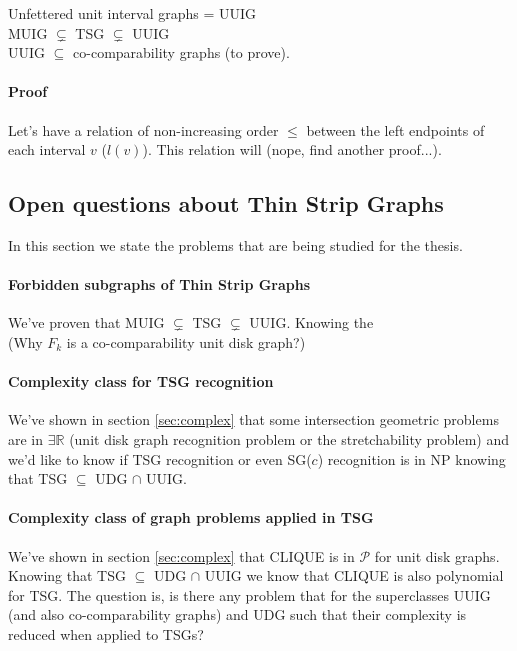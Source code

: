 Unfettered unit interval graphs = UUIG\\

MUIG $\subsetneq$ TSG $\subsetneq$ UUIG\\

UUIG $\subseteq$ co-comparability graphs (to prove).
\paragraph{Proof} Let's have a relation of non-increasing order $\leq$ between the left
endpoints of each interval $v$ ($l(v)$). This relation will (nope, find another proof...).


\subsection{Open questions about Thin Strip Graphs}
In this section we state the problems that are being studied for the thesis.

\paragraph{Forbidden subgraphs of Thin Strip Graphs}
  We've proven that MUIG $\subsetneq$ TSG $\subsetneq$ UUIG. Knowing the\\
  (Why $F_k$ is a co-comparability unit disk graph?)

\paragraph{Complexity class for TSG recognition}
  We've shown in section \ref{sec:complex} that some intersection
  geometric problems are in $\exists \mathbb{R}$ (unit disk graph
  recognition problem or the stretchability problem) and we'd like to
  know if TSG recognition or even SG($c$) recognition is in NP knowing
  that TSG $\subseteq$ UDG $\cap$ UUIG.

\paragraph{Complexity class of graph problems applied in TSG}
  We've shown in section \ref{sec:complex} that CLIQUE is in $\mathcal{P}$ for
  unit disk graphs. Knowing that TSG $\subseteq$ UDG $\cap$ UUIG we know that CLIQUE
  is also polynomial for TSG. The question is, is there any problem that for the superclasses
  UUIG (and also co-comparability graphs) and UDG such that their complexity is reduced
  when applied to TSGs?
